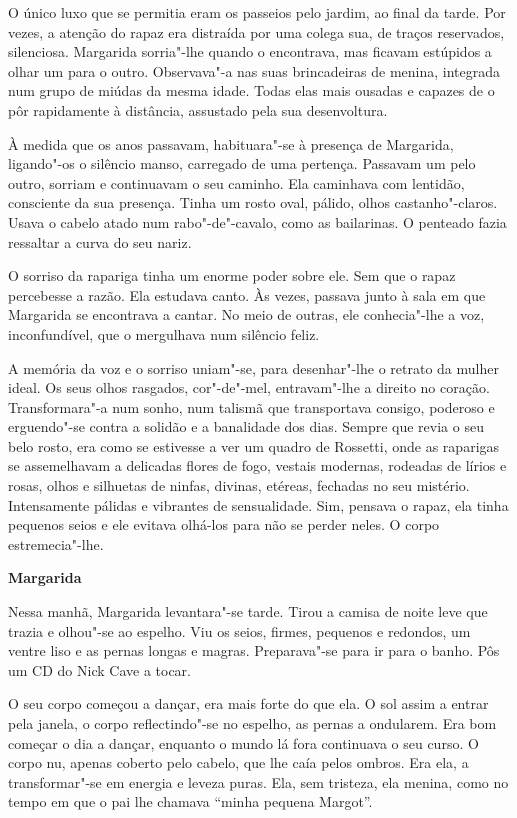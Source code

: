 O único luxo que se permitia eram os passeios pelo jardim, ao final da
tarde. Por vezes, a atenção do rapaz era distraída por uma colega sua,
de traços reservados, silenciosa. Margarida sorria"-lhe quando o
encontrava, mas ficavam estúpidos a olhar um para o outro. Observava"-a
nas suas brincadeiras de menina, integrada num grupo de miúdas da mesma
idade. Todas elas mais ousadas e capazes de o pôr rapidamente à
distância, assustado pela sua desenvoltura.

À medida que os anos passavam, habituara"-se à presença de Margarida,
ligando"-os o silêncio manso, carregado de uma pertença. Passavam um pelo
outro, sorriam e continuavam o seu caminho. Ela caminhava com lentidão,
consciente da sua presença. Tinha um rosto oval, pálido, olhos
castanho"-claros. Usava o cabelo atado num rabo"-de"-cavalo, como as
bailarinas. O penteado fazia ressaltar a curva do seu nariz.

O sorriso da rapariga tinha um enorme poder sobre ele. Sem que o rapaz
percebesse a razão. Ela estudava canto. Às vezes, passava junto à sala
em que Margarida se encontrava a cantar. No meio de outras, ele
conhecia"-lhe a voz, inconfundível, que o mergulhava num silêncio feliz.

A memória da voz e o sorriso uniam"-se, para desenhar"-lhe o retrato da
mulher ideal. Os seus olhos rasgados, cor"-de"-mel, entravam"-lhe a direito
no coração. Transformara"-a num sonho, num talismã que transportava
consigo, poderoso e erguendo"-se contra a solidão e a banalidade dos
dias. Sempre que revia o seu belo rosto, era como se estivesse a ver um
quadro de Rossetti, onde as raparigas se assemelhavam a delicadas flores
de fogo, vestais modernas, rodeadas de lírios e rosas, olhos e silhuetas
de ninfas, divinas, etéreas, fechadas no seu mistério. Intensamente
pálidas e vibrantes de sensualidade. Sim, pensava o rapaz, ela tinha
pequenos seios e ele evitava olhá-los para não se perder neles. O corpo
estremecia"-lhe.

\vspace*{1.8cm}
\noindent{}\textbf{Margarida}

\bigskip

Nessa manhã, Margarida levantara"-se tarde. Tirou a camisa de noite leve
que trazia e olhou"-se ao espelho. Viu os seios, firmes, pequenos e
redondos, um ventre liso e as pernas longas e magras. Preparava"-se para
ir para o banho. Pôs um CD do Nick Cave a tocar.

O seu corpo começou a dançar, era mais forte do que ela. O sol assim a
entrar pela janela, o corpo reflectindo"-se no espelho, as pernas a
ondularem. Era bom começar o dia a dançar, enquanto o mundo lá fora
continuava o seu curso. O corpo nu, apenas coberto pelo cabelo, que lhe
caía pelos ombros. Era ela, a transformar"-se em energia e leveza puras.
Ela, sem tristeza, ela menina, como no tempo em que o pai lhe chamava
``minha pequena Margot''.

